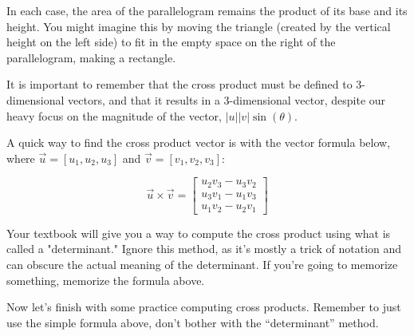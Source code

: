 \documentclass{ximera}
\begin{document}
In each case, the area of the parallelogram remains the product of its base and its height. You might imagine this by moving the triangle (created by the vertical height on the left side) to fit in the empty space on the right of the parallelogram, making a rectangle.

It is important to remember that the cross product must be defined to 3-dimensional vectors, and that it results in a 3-dimensional vector, despite our heavy focus on the magnitude of the vector, $|u||v|\sin(\theta)$.

\begin{definition}
    A quick way to find the cross product vector is with the vector formula below, where $\vec{u}=[u_1,u_2,u_3]$ and $\vec{v}=[v_1,v_2,v_3]$: 

    \[\vec{u}\times \vec{v} = 
    \begin{bmatrix}
    u_2 v_3 - u_3 v_2 \\
    u_3 v_1 - u_1 v_3 \\
    u_1 v_2 - u_2 v_1
    \end{bmatrix}\]
\end{definition}

\begin{remark}
Your textbook will give you a way to compute the cross product using what is called a "determinant." Ignore this method, as it's mostly a trick of notation and can obscure the actual meaning of the determinant. If you're going to memorize something, memorize the formula above.
\end{remark}

Now let's finish with some practice computing cross products. Remember to just use the simple formula above, don't bother with the ``determinant'' method.
\end{document}
